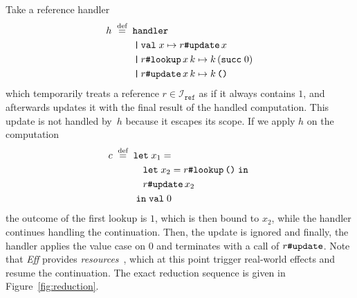 \documentclass{LMCS}
\newcommand{\defeq}{\mathrel{\;\stackrel{\text{def}}{=}\;}}
\newcommand{\kord}[1]{\mathtt{#1}}
\newcommand{\kop}[1]{\;\mathtt{#1}\;}
\newcommand{\kpre}[1]{\mathtt{#1}\;}
\newcommand{\case}{\mathop{\text{\texttt{|}}}}
\newcommand{\handler}{\kpre{handler}}
\newcommand{\hash}[2]{#1\text{\texttt{\char35}}#2}
\newcommand{\letin}[1]{\kpre{let} #1 \kop{in}}
\newcommand{\call}[4]{{\hash{#1}{#2}\,{#3}\, #4}}
\newcommand{\unt}{\kord{\text{\texttt{()}}}}
\newcommand{\val}{\kpre{val}}
\renewcommand{\succ}{\kpre{succ}}
\newcommand{\insts}{\mathcal{I}}
\newcommand{\Eff}{\emph{Eff}\xspace}
\begin{document}
\begin{exa}
\label{exa:reduction}
Take a reference handler
\begin{align*}
  h \defeq {} &\handler \\
  &\case \val x \mapsto \hash{r}{\kord{update}} \, x \\
  &\case \call{r}{\kord{lookup}}{x}{k} \mapsto k \, (\succ 0) \\
  &\case \call{r}{\kord{update}}{x}{k} \mapsto k \, \unt
\end{align*}
which temporarily treats a reference $r \in \insts_{\kord{ref}}$ as if it always contains $1$,
and afterwards updates it with the final result of the handled computation.
This update is not handled by~$h$ because it escapes its scope.
If we apply $h$ on the computation
\begin{align*}
  c \defeq {} &\letin{x_1 = \\
  &\quad \letin{x_2 = \hash{r}{\kord{lookup}} \, \unt} \\
  &\quad \hash{r}{\kord{update}} \, x_2 \\
  &} \val 0
\end{align*}
the outcome of the first lookup is $1$, which is then bound to $x_2$,
while the handler continues handling the continuation.
Then, the update is ignored and finally,
the handler applies the value case on $0$ and terminates with a call of $\hash{r}{\kord{update}}$.
Note that \Eff provides \emph{resources}~\cite{bauer2012programming},
which at this point trigger real-world effects and resume the continuation.
The exact reduction sequence is given in Figure~\ref{fig:reduction}.
\end{exa}
\end{document}
